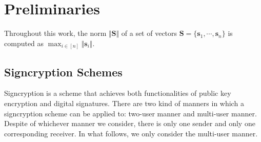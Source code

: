 \documentclass[a4paper,11pt,onecolumn]{elsarticle}
\begin{document}
	\section{Preliminaries} \label{pre}
 
Throughout this work, the norm $\Vert \mathbf{S} \Vert$ of a set of vectors
	$\mathbf{S}=\{\mathbf{s}_1,\cdots, \mathbf{s}_n\}$ is computed as $\max_{i \in[n]} \Vert \mathbf{s}_i \Vert$. \\
	
	
	
	\iffalse
	\subsection{Signcryption Schemes} \label{sc}
	
	Signcryption is a scheme that achieves both functionalities of public key encryption and digital signatures. There are two kind of manners in which a signcryption scheme can be applied to: two-user manner and multi-user manner. Despite of whichever manner we consider, there is only one sender and only one corresponding receiver. In what follows, we only consider the multi-user manner.
	
\end{document}
